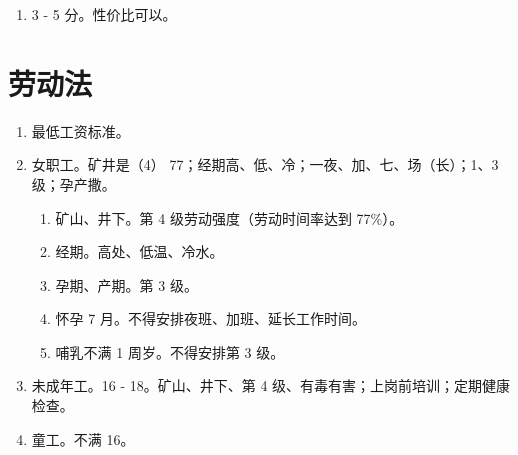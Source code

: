 \begin{enumerate}
  \item 3 - 5 分。性价比可以。
\end{enumerate}

\section{劳动法}
\begin{enumerate}
  \item 最低工资标准。
  \item 女职工。矿井是（4） 77；经期高、低、冷；一夜、加、七、场（长）；1、3 级；孕产撒。
        \begin{enumerate}
          \item 矿山、井下。第 4 级劳动强度（劳动时间率达到 77\%）。
          \item 经期。高处、低温、冷水。
          \item 孕期、产期。第 3 级。
          \item 怀孕 7 月。不得安排夜班、加班、延长工作时间。
          \item 哺乳不满 1 周岁。不得安排第 3 级。
        \end{enumerate}
  \item 未成年工。16 - 18。矿山、井下、第 4 级、有毒有害；上岗前培训；定期健康检查。
  \item 童工。不满 16。
\end{enumerate}
